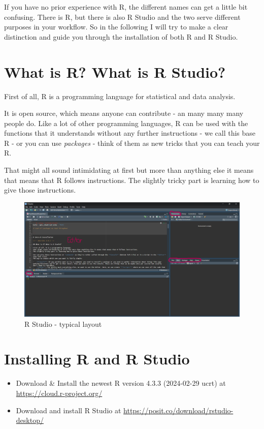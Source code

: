 \documentclass[
]{book}
\providecommand{\tightlist}{%
  \setlength{\itemsep}{0pt}\setlength{\parskip}{0pt}}
\begin{document}
If you have no prior experience with R, the different names can get a little bit confusing.
There is R, but there is also R Studio and the two serve different purposes in your workflow.
So in the following I will try to make a clear distinction and guide you through the installation of both R and R Studio.

\section{What is R? What is R Studio?}\label{what-is-r-what-is-r-studio}

First of all, R is a programming language for statistical and data analysis.

It is open source, which means anyone can contribute - an many many many people do.
Like a lot of other programming languages, R can be used with the functions that it understands without any further instructions - we call this base R - or you can use \emph{packages} - think of them as new tricks that you can teach your R.

That might all sound intimidating at first but more than anything else it means that means that R follows instructions.
The slightly tricky part is learning how to give those instructions.

\begin{figure}
\centering
\includegraphics{./img/rstudio.png}
\caption{R Studio - typical layout}
\end{figure}

\section{Installing R and R Studio}\label{installing-r-and-r-studio}

\begin{itemize}
\tightlist
\item
  Download \& Install the newest R version 4.3.3 (2024-02-29 ucrt) at \url{https://cloud.r-project.org/}
\item
  Download and install R Studio at \url{https://posit.co/download/rstudio-desktop/}
\end{itemize}
\end{document}
